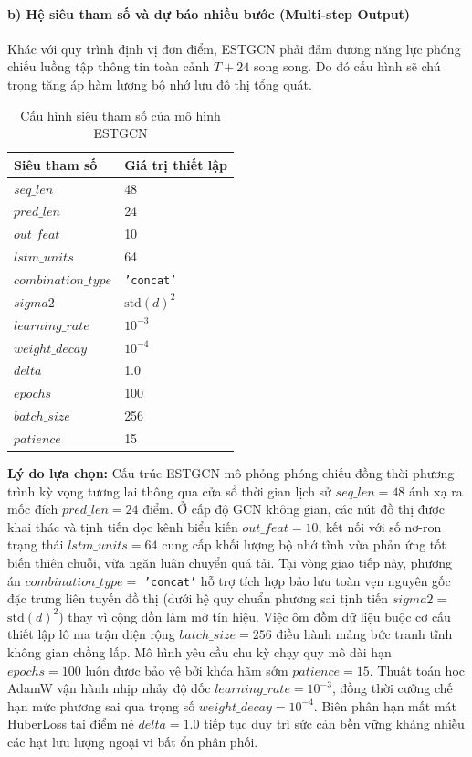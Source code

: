 \paragraph{b) Hệ siêu tham số và dự báo nhiều bước (Multi-step Output)}

Khác với quy trình định vị đơn điểm, ESTGCN phải đảm đương năng lực phóng chiếu luồng tập thông tin toàn cảnh $T+24$ song song. Do đó cấu hình sẽ chú trọng tăng áp hàm lượng bộ nhớ lưu đồ thị tổng quát.

\begin{table}[H]
    \centering
    \caption{Cấu hình siêu tham số của mô hình ESTGCN}
    \label{tab:estgcn_params_ch2}
    \renewcommand{\arraystretch}{1.3}
    \begin{tabular}{p{5.5cm} p{8.8cm}}
    \toprule
    \textbf{Siêu tham số} & \textbf{Giá trị thiết lập} \\
    \midrule
    $seq\_len$ & 48 \\
    $pred\_len$ & 24 \\
    $out\_feat$ & 10 \\
    $lstm\_units$ & 64 \\
    $combination\_type$ & \texttt{'concat'} \\
    $sigma2$ & $\text{std}(d)^2$ \\
    $learning\_rate$ & $10^{-3}$ \\
    $weight\_decay$ & $10^{-4}$ \\
    $delta$ & 1.0 \\
    $epochs$ & 100 \\
    $batch\_size$ & 256 \\
    $patience$ & 15 \\
    \bottomrule
    \end{tabular}
\end{table}

\textbf{Lý do lựa chọn:} Cấu trúc ESTGCN mô phỏng phóng chiếu đồng thời phương trình kỳ vọng tương lai thông qua cửa sổ thời gian lịch sử $seq\_len=48$ ánh xạ ra mốc đích $pred\_len=24$ điểm. Ở cấp độ GCN không gian, các nút đồ thị được khai thác và tịnh tiến dọc kênh biểu kiến $out\_feat=10$, kết nối với số nơ-ron trạng thái $lstm\_units=64$ cung cấp khối lượng bộ nhớ tĩnh vừa phản ứng tốt biến thiên chuỗi, vừa ngăn luân chuyển quá tải. Tại vòng giao tiếp này, phương án $combination\_type=$ \texttt{'concat'} hỗ trợ tích hợp bảo lưu toàn vẹn nguyên gốc đặc trưng liên tuyến đồ thị (dưới hệ quy chuẩn phương sai tịnh tiến $sigma2=$ $\text{std}(d)^2$) thay vì cộng dồn làm mờ tín hiệu. Việc ôm đồm dữ liệu buộc cơ cấu thiết lập lô ma trận diện rộng $batch\_size=256$ điều hành mảng bức tranh tĩnh không gian chồng lấp. Mô hình yêu cầu chu kỳ chạy quy mô dài hạn $epochs=100$ luôn được bảo vệ bởi khóa hãm sớm $patience=15$. Thuật toán học AdamW vận hành nhịp nhảy độ dốc $learning\_rate=10^{-3}$, đồng thời cưỡng chế hạn mức phương sai qua trọng số $weight\_decay=10^{-4}$. Biên phân hạn mất mát HuberLoss tại điểm nẻ $delta=1.0$ tiếp tục duy trì sức cản bền vững kháng nhiễu các hạt lưu lượng ngoại vi bất ổn phân phối.


